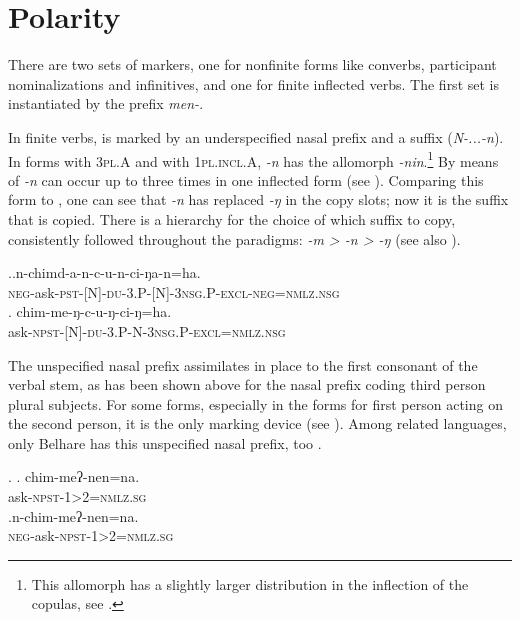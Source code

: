  


\section{Polarity}\label{neg}

There are two sets of  markers, one for nonfinite forms like converbs, participant nominalizations and infinitives, and one for finite inflected verbs. The first set is instantiated by the prefix \emph{men-}. 

In finite verbs,  is marked by an underspecified nasal prefix and a suffix (\emph{N-...-n}). In forms with {\scshape 3pl.A} and with {\scshape 1pl.incl.A}, \emph{-n} has the allomorph \emph{-nin}.\footnote{This allomorph has a slightly larger distribution in the inflection of the copulas, see  .} By means of   \emph{-n} can occur up to three times in one inflected form (see \Next[a]). Comparing this form to \Next[b], one can see that \emph{-n} has replaced \emph{-ŋ} in the copy slots; now it is the  suffix that is copied. There is a hierarchy for the choice of which suffix to copy, consistently followed throughout the paradigms: \emph{-m > -n > -ŋ} (see also ). 

\ex.\ag.n-chimd-a-n-c-u-n-ci-ŋa-n=ha.\\
{\scshape neg-}ask{\scshape -pst-[N]-du-3.P-[N]-3nsg.P-excl-neg=nmlz.nsg}\\
	\bg. chim-me-ŋ-c-u-ŋ-ci-ŋ=ha.\\
	ask{\scshape -npst-[N]-du-3.P-N-3nsg.P-excl=nmlz.nsg}\\
	
	
The unspecified nasal prefix assimilates in place to the first consonant of the verbal stem, as has been shown above for the nasal prefix coding third person plural subjects. For some forms, especially in the forms for first person acting on the second person, it is the only  marking device (see \Next). Among related languages, only Belhare has this unspecified nasal prefix, too \citep[554]{Bickel2003Belhare}. 

\ex. \ag.  chim-meʔ-nen=na.\\
	 ask{\scshape -npst-1>2=nmlz.sg}\\
		\bg.n-chim-meʔ-nen=na.\\
	{\scshape neg-}ask{\scshape -npst-1>2=nmlz.sg}\\

